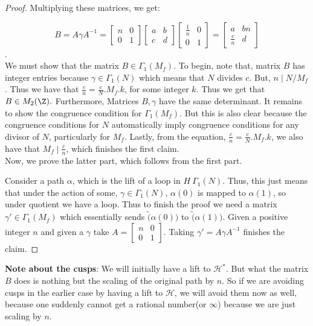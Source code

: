 \begin{lemma}
\begin{proof}
Multiplying these matrices, we get:

\[B= A \gamma A^{-1} = \begin{bmatrix} n & 0 \\ 0 & 1 \end{bmatrix} \begin{bmatrix} a & b \\ c & d \end{bmatrix} \begin{bmatrix} \frac{1}{n} & 0 \\ 0 & 1 \end{bmatrix} = \begin{bmatrix} a & bn \\ \frac{c}{n} & d \end{bmatrix} \].  \\
We must show that the matrix $B \in \Gamma_1(M_f).$ To begin, note that, matrix $B$ has integer entries because $\gamma \in \Gamma_1(N)$ which means that $N$ divides $c$. But, $n \mid N / M_{f}$. Thus we have that $\frac{c}{n}=\frac{c}{N}.M_f.k$, for some integer $k$. Thus we get that $B \in M_2(\Z).$ Furthermore, Matrices $B, \gamma$ have the same determinant. It remains to show the congruence condition for $\Gamma_1(M_f)$. But this is also clear because the congruence conditions for $N$ automatically imply congruence conditions for any divisor of $N$, particularly for $M_f$. Lastly, from the equation, $\frac{c}{n}=\frac{c}{N}.M_f.k$, we also have that $M_f \mid \frac{c}{n}$, which finishes the first claim. \\

Now, we prove the latter part, which follows from the first part. 

Consider a path $\alpha$, which is the lift of a loop in $H\ \Gamma_1(N)$. Thus, this just means that under the action of some, $\gamma \in \Gamma_1(N)$, $\alpha(0)$ is mapped to $\alpha(1)$, so under quotient we have a loop. Thus to finish the proof we need a matrix $\gamma'\in \Gamma_1(M_f)$ which essentially sends $\tilde(\alpha(0))$ to $\tilde(\alpha(1))$. Given a positive integer $n$ and given a $\gamma$ take \( A = \begin{bmatrix} n & 0 \\ 0 & 1 \end{bmatrix} \). Taking $\gamma'=A\gamma A^{-1}$ finishes the claim.  
\end{proof}
\end{lemma}
\textbf{Note about the cusps}: We will initially have a lift to $\mathcal{H}^{*}$. But what the matrix $B$ does is nothing but the scaling of the original path by $n$. So if we are avoiding cusps in the earlier case by having a lift to $\mathcal{H}$, we will avoid them now as well, because one suddenly cannot get a rational number(or $\infty$) because we are just scaling by $n$.
